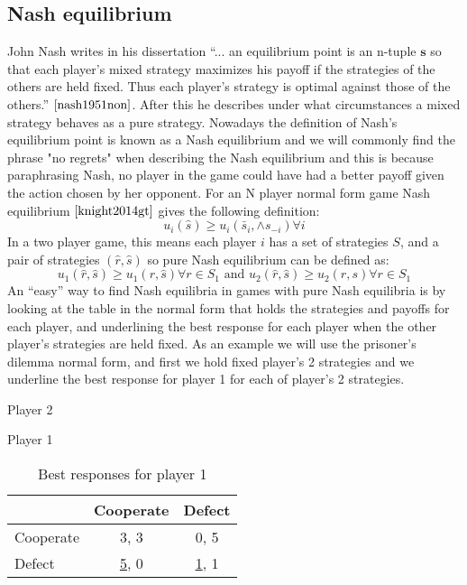 \subsection{Nash equilibrium}\label{third_section}
John Nash writes in his dissertation ``... an equilibrium point is an n-tuple $\textbf{s}$ so that each player's mixed strategy maximizes his payoff if the strategies of the others are held fixed. Thus each player's strategy is optimal against those of the others.'' $\cite{nash1951non}$.  After this he describes under what circumstances a mixed strategy behaves as a pure strategy. Nowadays the definition of Nash's equilibrium point is known as a Nash equilibrium and we will commonly find the phrase "no regrets" when describing the Nash equilibrium and this is because paraphrasing Nash, no player in the game could have had a better payoff given the action chosen by her opponent. For an N player normal form game Nash equilibrium $\cite{knight2014gt}$ gives the following definition:
\begin{equation}
u_i(\hat{s}) \geq u_i(\bar{s}_i, \wedge{s}_{-i}) \forall i
\end{equation}
 In a two player game, this means each player $\textit{i}$ has a set of strategies $\textit{S}$, and a pair of strategies $(\hat{r}, \hat{s})$ so pure Nash equilibrium can be defined as:
\begin{equation}
u_1(\hat{r}, \hat{s}) \geq u_1(r, \hat{s}) \forall r \in S_1   \text{ and }  u_2(\hat{r}, \hat{s}) \geq u_2(\hat{r}, s) \forall r \in S_1
\end{equation}
An ``easy'' way to find Nash equilibria in games with pure Nash equilibria is by looking at the table in the normal form that holds the strategies and payoffs for each player, and underlining the best response for each player when the other player's strategies are held fixed.
As an example we will use the prisoner's dilemma normal form, and first we hold fixed player's 2 strategies and we underline the best response for player 1 for each of player's 2 strategies.

\begin{table}[h]
\begin{center}
Player 2

Player 1
\begin{tabular}{|l|c|c|}
\hline
 & Cooperate & Defect\\ 
\hline
Cooperate & 3, 3 & 0, 5\\
\hline
Defect & \underline{5}, 0 & \underline{1}, 1\\
\hline
\end{tabular}
\caption{Best responses for player 1}
\label{tab:normformbr1}
\end{center}
\end{table}

